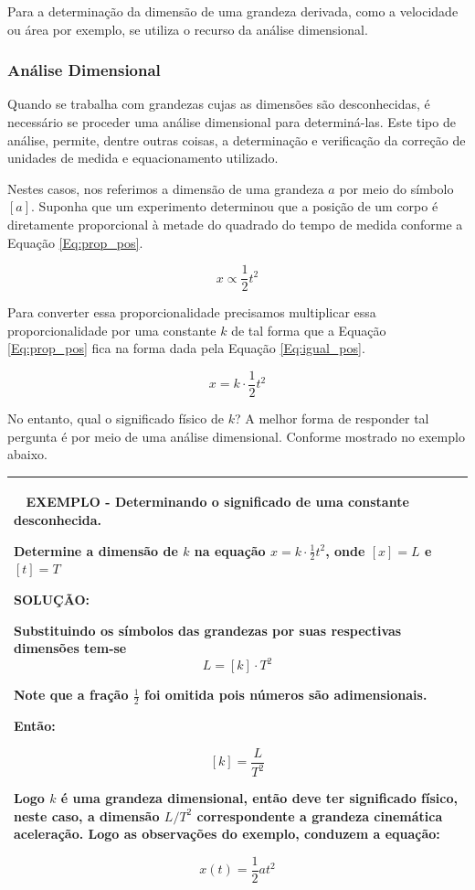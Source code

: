 \documentclass[a4paper, 11pt]{report}
\newenvironment{myboxed}
    {
        \begin{center}
        \begin{tabular}{p{0.7\textwidth}}
        \hline\
    }
    { 
        \\\hline
        \end{tabular} 
        \end{center}
    }
\begin{document}
Para a determinação da dimensão de uma grandeza derivada, como a velocidade ou 
área por exemplo, se utiliza o recurso da análise dimensional. 

\subsubsection{Análise Dimensional}
Quando se trabalha com grandezas cujas as dimensões são desconhecidas, é
necessário se proceder uma análise dimensional para determiná-las. Este tipo de 
análise, permite, dentre outras coisas, a determinação e verificação da correção
de unidades de medida e equacionamento utilizado. 

Nestes casos, nos referimos a dimensão de uma grandeza $a$ por meio do símbolo
$[a]$. Suponha que um experimento determinou que a posição de um corpo é 
diretamente proporcional à metade do quadrado do tempo de medida conforme a 
Equação \ref{Eq:prop_pos}.

\begin{equation}
    x \propto \frac{1}{2} t^2
    \label{Eq:prop_pos}
\end{equation}

Para converter essa proporcionalidade precisamos multiplicar essa 
proporcionalidade por uma constante $k$ de tal forma que a Equação 
\ref{Eq:prop_pos} fica na forma dada pela Equação \ref{Eq:igual_pos}.

\begin{equation}
    x = k \cdot \frac{1}{2} t^2
    \label{Eq:igual_pos}
\end{equation}

No entanto, qual o significado físico de $k$? A melhor forma de responder tal 
pergunta é por meio de uma análise dimensional. Conforme mostrado no exemplo 
abaixo. 

\begin{myboxed}
    \textbf{EXEMPLO - Determinando o significado de uma constante desconhecida.}

    Determine a dimensão de $k$ na equação $x = k \cdot \frac{1}{2} t^2$, 
    onde $[x] = L$ e $[t] = T$

    \textbf{SOLUÇÃO:}

    Substituindo os símbolos das grandezas por suas respectivas dimensões tem-se
    $$
        L = [k] \cdot T^2
    $$
    
    Note que a fração $\frac{1}{2}$ foi omitida pois números são adimensionais. 

    Então:

    $$
        [k] = \frac{L}{T^2}
    $$

    Logo $k$ é uma grandeza dimensional, então deve ter significado físico, 
    neste caso, a dimensão $L/T^2$ correspondente a grandeza cinemática 
    aceleração. Logo as observações do exemplo, conduzem a equação:

    $$
        x(t) = \frac{1}{2} a t^2
    $$
\end{myboxed}
\end{document}

